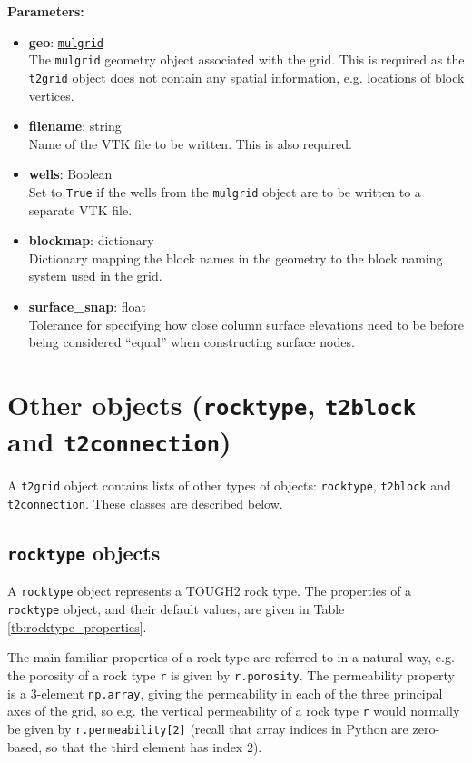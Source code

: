 \textbf{Parameters:}
\begin{itemize}
\item \textbf{geo}: \hyperref[mulgrids]{\texttt{mulgrid}}\\
  The \texttt{mulgrid} geometry object associated with the grid.  This is required as the \texttt{t2grid} object does not contain any spatial information, e.g. locations of block vertices.
\item \textbf{filename}: string\\
  Name of the VTK file to be written.  This is also required.
\item \textbf{wells}: Boolean\\
  Set to \texttt{True} if the wells from the \texttt{mulgrid} object are to be written to a separate VTK file.
\item \textbf{blockmap}: dictionary\\
  Dictionary mapping the block names in the geometry to the block naming system used in the grid.
\item \textbf{surface\_snap}: float\\
  Tolerance for specifying how close column surface elevations need to be before being considered ``equal'' when constructing surface nodes.
\end{itemize}

\section{Other objects (\texttt{rocktype}, \texttt{t2block} and \texttt{t2connection})}

A \texttt{t2grid} object contains lists of other types of objects: \texttt{rocktype}, \texttt{t2block} and \texttt{t2connection}.  These classes are described below.

\subsection{\texttt{rocktype} objects}
\label{rocktypeobjects}

A \texttt{rocktype} object represents a TOUGH2 rock type.  The properties of a \texttt{rocktype} object, and their default values, are given in Table \ref{tb:rocktype_properties}.

The main familiar properties of a rock type are referred to in a natural way, e.g. the porosity of a rock type \texttt{r} is given by \texttt{r.porosity}.  The permeability property is a 3-element \texttt{np.array}, giving the permeability in each of the three principal axes of the grid, so e.g. the vertical permeability of a rock type \texttt{r} would normally be given by \texttt{r.permeability[2]} (recall that array indices in Python are zero-based, so that the third element has index 2).

